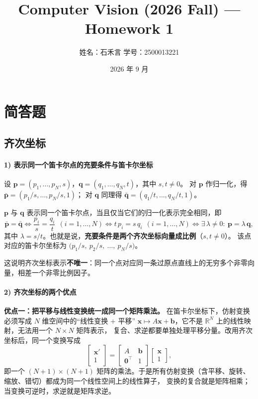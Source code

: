 \documentclass[11pt,a4paper]{ctexart}
\title{\textbf{Computer Vision (2026 Fall) --- Homework 1}}
\author{姓名：石禾言 \qquad 学号：2500013221}
\date{2026 年 9 月}
\begin{document}
\maketitle

\section{简答题}

\subsection{齐次坐标}

\paragraph{1) 表示同一个笛卡尔点的充要条件与笛卡尔坐标}

设 $\mathbf p=(p_1,\dots,p_N,s)$，$\mathbf q=(q_1,\dots,q_N,t)$，其中 $s,t\neq 0$。
对 $\mathbf p$ 作归一化，得 $\bar{\mathbf p}=(p_1/s,\dots,p_N/s,1)$；
对 $\mathbf q$ 同理得 $\bar{\mathbf q}=(q_1/t,\dots,q_N/t,1)$。

$\mathbf p$ 与 $\mathbf q$ 表示同一个笛卡尔点，当且仅当它们的归一化表示完全相同，即
\begin{equation}
\bar{\mathbf p}=\bar{\mathbf q}
\iff \frac{p_i}{s}=\frac{q_i}{t}\ \ (i=1,\dots,N)
\iff t\,p_i=s\,q_i\ \ (i=1,\dots,N)
\iff \exists\,\lambda\neq 0:\ \mathbf p=\lambda\,\mathbf q,
\end{equation}
其中 $\lambda=s/t$。也就是说，\textbf{充要条件是两个齐次坐标向量成比例}（$s,t\neq 0$）。
该点对应的笛卡尔坐标为 $\bigl(p_1/s,\ p_2/s,\ \dots,\ p_N/s\bigr)$。

这说明齐次坐标表示\textbf{不唯一}：同一个点对应同一条过原点直线上的无穷多个非零向量，相差一个非零比例因子。

\paragraph{2) 齐次坐标的两个优点}

\textbf{优点一：把平移与线性变换统一成同一个矩阵乘法。}
在笛卡尔坐标下，仿射变换必须写成 $N$ 维空间中的“线性变换 $+$ 平移”
$\mathbf x\mapsto A\mathbf x+\mathbf b$，它不是 $\mathbb R^N$ 上的线性映射，无法用一个 $N\times N$ 矩阵表示，
复合、求逆都要单独处理平移分量。改用齐次坐标后，同一个变换写成
\begin{equation}
\begin{bmatrix}\mathbf x'\\ 1\end{bmatrix}
=\begin{bmatrix}A&\mathbf b\\ \mathbf 0^\top &1\end{bmatrix}
\begin{bmatrix}\mathbf x\\ 1\end{bmatrix},
\end{equation}
即一个 $(N{+}1)\times(N{+}1)$ 矩阵的乘法。于是所有仿射变换（含平移、旋转、缩放、错切）都成为同一个线性空间上的线性算子，
变换的复合就是矩阵相乘；当变换可逆时，求逆就是矩阵求逆。
\end{document}
